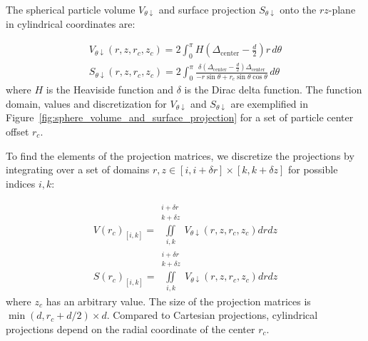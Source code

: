 \documentclass[10pt, a4paper]{article}
\begin{document}
\begin{multicols}{2}

The spherical particle volume $V_{\theta \downarrow}$ and surface projection $S_{\theta \downarrow}$ onto the $rz$-plane in cylindrical coordinates are:

\begin{gather}
    V_{\theta \downarrow}(r, z, r_c, z_c) = 2\int_{0}^{\pi} H\left( \Delta_{\text{center}} - \frac{d}{2} \right) r \, d\theta
    \\
    S_{\theta \downarrow}(r, z, r_c, z_c) = 2\int_{0}^{\pi} \frac{\delta \left( \Delta_{\text{center}} - \frac{d}{2} \right) \Delta_{\text{center}}}{-r \sin \theta + r_c \sin \theta \cos \theta} \, d\theta
\end{gather}
where $H$ is the Heaviside function and $\delta$ is the Dirac delta function.
The function domain, values and discretization for $V_{\theta \downarrow}$ and $S_{\theta \downarrow}$ are exemplified in Figure~\ref{fig:sphere_volume_and_surface_projection} for a set of particle center offset $r_c$.

To find the elements of the projection matrices, we discretize the projections by integrating over a set of domains $r, z \in [i, i + \delta r] \times [k, k + \delta z]$ for possible indices $i, k$:

\begin{eqnarray}
    V(r_c)_{[i, k]} = \iint \limits_{i, k}^{\substack{i+\delta r\\ k+\delta z}} V_{\theta \downarrow} (r, z, r_c, z_c) dr dz
    \\
    S(r_c)_{[i, k]} = \iint \limits_{i, k}^{\substack{i+\delta r\\ k+\delta z}} V_{\theta \downarrow} (r, z, r_c, z_c) dr dz
\end{eqnarray}
where $z_c$ has an arbitrary value.
The size of the projection matrices is $\min(d, r_c + d/2) \times d$.
Compared to Cartesian projections, cylindrical projections depend on the radial coordinate of the center $r_c$.


\end{multicols}
\end{document}
